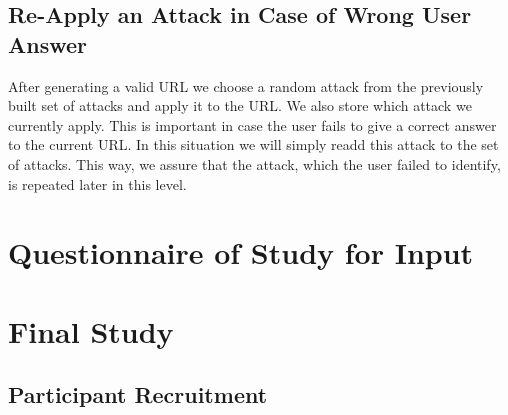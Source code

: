 \subsection{Re-Apply an Attack in Case of Wrong User Answer}
After generating a valid URL we choose a random attack from the previously built set of attacks and apply it to the URL. We also store which attack we currently apply. This is important in case  the user fails to give a correct answer to the current URL. In this situation we will simply readd this attack to the set of attacks.
This way, we assure that the attack, which the user failed to identify, is repeated later in this level.

\section{Questionnaire of Study for Input}
\label{s:presurvey_form}



\section{Final Study}

\subsection{Participant Recruitment}
\label{s:participant_recruitment_texts}


